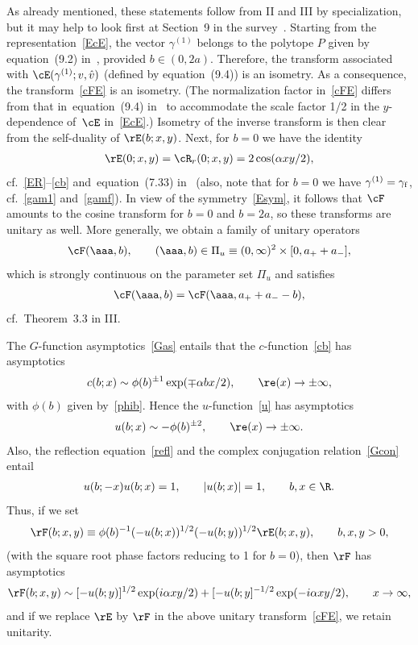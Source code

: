\documentclass[pdftex]{sigma}
\numberwithin{equation}{section}
\begin{document}
As already mentioned, these statements follow from II and III by specialization, but it may help to look f\/irst at Section~9 in the survey~\cite{Rsurv}. Starting from the representation~\eqref{EcE}, the
vector $\gamma^{(1)}$ belongs to the polytope $P$ given by equation~(9.2) in~\cite{Rsurv}, provided $b\in (0,2a)$. Therefore, the transform associated with $\cE(\gamma^{(1)};v,\hat{v})$ (def\/ined by equation~(9.4)) is an isometry. As a consequence, the transform~\eqref{cFE} is an isometry. (The normalization factor in~\eqref{cFE} dif\/fers from that in~equation~(9.4) in~\cite{Rsurv} to accommodate the scale factor 1/2 in the $y$-dependence of~$\cE$ in~\eqref{EcE}.) Isometry of the inverse transform is then clear from the self-duality of $\rE(b;x,y)$. Next, for $b=0$ we have the identity
\begin{gather}\label{ER0}
\rE(0;x,y)=\cR_r(0;x,y)=2\cos(\alpha xy/2),
\end{gather}
cf.~\eqref{ER}--\eqref{cb} and~equation~(7.33) in~\cite{Rsurv} (also, note that for $b=0$ we have $\gamma^{(1)}=\gamma_{\rm f}$, cf.~\eqref{gam1} and~\eqref{gamf}). In view of the symmetry~\eqref{Esym},
it follows that $\cF$ amounts to the cosine transform for $b=0$ and $b=2a$, so these transforms are unitary as well. More generally, we obtain a family of unitary operators
\begin{gather}
\cF(\aaa,b),\qquad (\aaa,b)\in \Pi_u\equiv(0,\infty)^2\times[0,a_{+}+a_{-}],
\end{gather}
which is strongly continuous on the parameter set $\Pi_u$ and satisf\/ies
\begin{gather}\label{cFsym}
\cF(\aaa, b)=\cF(\aaa, a_{+}+a_{-}-b),
\end{gather}
cf.~Theorem~3.3 in III.

The $G$-function asymptotics~\eqref{Gas}
entails that the $c$-function~\eqref{cb} has asymptotics
\begin{gather}\label{cas}
c(b;x)\sim \phi(b)^{\pm 1}\exp(\mp \alpha bx/2),\qquad \re (x)\to\pm\infty,
\end{gather}
with $\phi(b)$ given by~\eqref{phib}. Hence the
$u$-function~\eqref{u} has asymptotics
\begin{gather}\label{uas}
u(b;x)\sim -\phi(b)^{\pm 2},\qquad \re ( x)\to  \pm\infty.
\end{gather}
Also, the ref\/lection equation~\eqref{refl} and the complex conjugation relation~\eqref{Gcon}
entail
\begin{gather}
u(b;-x)u(b;x)=1,\qquad |u(b;x)|=1,\qquad b,x\in\R.
\end{gather}
Thus, if we set
\begin{gather}\label{Fdef}
\rF(b;x,y)\equiv \phi(b)^{-1}(-u(b;x))^{1/2}(-u(b;y))^{1/2}\rE(b;x,y),\qquad b,x,y>0,
\end{gather}
(with the square root phase factors reducing to 1 for $b=0$), then $\rF$ has asymptotics
\begin{gather}\label{Fas}
\rF(b;x,y)\sim [-u(b;y)]^{1/2}\exp(i\alpha xy/2) +[-u(b;y]^{-1/2}\exp(-i\alpha xy/2),\qquad x\to \infty,
\end{gather}
and if we replace $\rE$ by $\rF$ in the above unitary transform~\eqref{cFE}, we retain unitarity.
\end{document}
